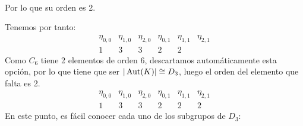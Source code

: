 \begin{ejercicio}
\begin{enumerate}
\begin{itemize}
\begin{align*}
                    \end{align*}
                    Por lo que su orden es 2.
            \end{itemize}
            Tenemos por tanto:
            \begin{equation*}
                \begin{array}{cccccc}
                    \eta_{0,0} & \eta_{1,0} & \eta_{2,0} & \eta_{0,1} & \eta_{1,1} & \eta_{2,1} \\
                    \hline
                    1 & 3 & 3 & 2 & 2 &
                \end{array}
            \end{equation*}
            Como $C_6$ tiene 2 elementos de orden 6, descartamos automáticamente esta opción, por lo que tiene que ser $|\operatorname{Aut}(K)|\cong D_3$, luego el orden del elemento que falta es 2.
            \begin{equation*}
                \begin{array}{cccccc}
                    \eta_{0,0} & \eta_{1,0} & \eta_{2,0} & \eta_{0,1} & \eta_{1,1} & \eta_{2,1} \\
                    \hline
                    1 & 3 & 3 & 2 & 2 & 2
                \end{array}
            \end{equation*}
            En este punto, es fácil conocer cada uno de los subgrupos de $D_3$:
            \begin{figure}[H]
                \centering
\end{figure}
\end{enumerate}
\end{ejercicio}
